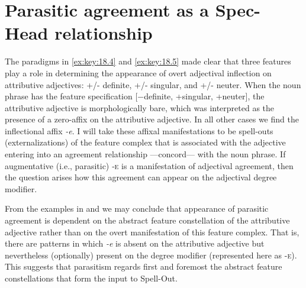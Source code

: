 \documentclass[output=paper]{langsci/langscibook}
\begin{document}
\section{Parasitic agreement as a Spec-Head relationship}\label{sec:key:18.7}

The paradigms in \eqref{ex:key:18.4} and \eqref{ex:key:18.5} made clear that three
features play a role in determining the appearance of overt adjectival
inflection on  attributive adjectives: +/- definite, +/- singular,
and +/- neuter. When the noun phrase has the feature specification [−definite,
+singular, +neuter], the attributive adjective is morphologically bare, which
was interpreted as the presence of a zero-affix on the attributive adjective.
In all other cases we find the inflectional affix \emph{-e}. I will take these
affixal manifestations to be spell-outs (externalizations) of the feature
complex that is associated with the adjective entering into an agreement
relationship —concord— with the noun phrase. If augmentative (i.e., parasitic)
\textsc{‑e} is a manifestation of adjectival agreement, then the question
arises how this agreement can appear on the adjectival degree modifier.

From the examples in  and  we may conclude that
appearance of parasitic agreement is dependent on the abstract feature
constellation of the attributive adjective rather than on the overt
manifestation of this feature complex. That is, there are patterns in which
\emph{-e} is absent on the attributive adjective but nevertheless (optionally)
present on the degree modifier (represented here as \textsc{-e}). This suggests
that parasitism regards first and foremost the abstract feature constellations
that form the input to Spell-Out.
\end{document}
